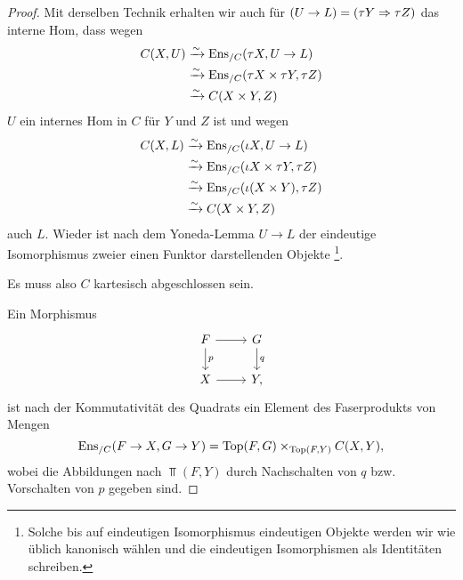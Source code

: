 \begin{proof}
  Mit derselben Technik erhalten wir auch für $(U \to L) = (\tau Y
  \Rightarrow \tau Z)$ das interne Hom, dass wegen
  \begin{align*}
    C(X, U)
    &\xrightarrow[]{\sim} \operatorname{Ens}_{/C}(\tau X, U \to L) \\
    &\xrightarrow[]{\sim} \operatorname{Ens}_{/C}(\tau X \times \tau Y, \tau Z) \\
    &\xrightarrow[]{\sim} C(X \times Y, Z)
  \end{align*}
  $U$ ein internes Hom in $C$ für $Y$ und $Z$ ist und wegen
  \begin{align*}
    C(X, L)
    &\xrightarrow[]{\sim} \operatorname{Ens}_{/C}(\iota X, U \to L) \\
    &\xrightarrow[]{\sim} \operatorname{Ens}_{/C}(\iota X \times \tau Y, \tau Z) \\
    &\xrightarrow[]{\sim} \operatorname{Ens}_{/C}(\iota (X \times Y), \tau Z) \\
    &\xrightarrow[]{\sim} C(X \times Y, Z)
  \end{align*}
  auch $L$. Wieder ist nach dem Yoneda-Lemma $U \to L$ der eindeutige
  Isomorphismus zweier einen Funktor darstellenden
  Objekte \footnote{Solche bis auf eindeutigen Isomorphismus
    eindeutigen Objekte werden wir wie üblich kanonisch wählen und die
    eindeutigen Isomorphismen als Identitäten schreiben.}.

  Es muss also $C$ kartesisch abgeschlossen sein.

  Ein Morphismus
  \[ \begin{tikzcd}
    F \arrow[r] \dar{p} & G \dar{q} \\
    X \arrow[r] & Y,
  \end{tikzcd} \]
  ist nach der Kommutativität des Quadrats ein Element des
  Faserprodukts von Mengen
  \[ \operatorname{Ens}_{/C}(F \to X, G \to Y) = \operatorname{Top}(F, G) \times_{\operatorname{Top}(F, Y)} C(X, Y), \]
  wobei die Abbildungen nach $\Top(F, Y)$ durch Nachschalten von $q$
  bzw. Vorschalten von $p$ gegeben sind.


\end{proof}
